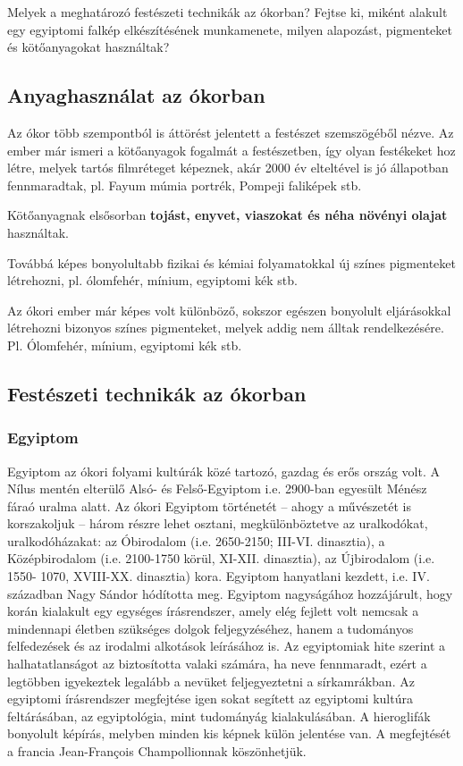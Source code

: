 	Melyek a meghatározó festészeti technikák az ókorban? Fejtse ki, miként alakult egy egyiptomi falkép elkészítésének munkamenete, milyen alapozást, pigmenteket és kötőanyagokat használtak?
	
	\subsection{Anyaghasználat az ókorban}
	
	Az ókor több szempontból is áttörést jelentett a festészet szemszögéből nézve. Az ember már ismeri a kötőanyagok fogalmát a festészetben, így olyan festékeket hoz létre, melyek tartós filmréteget képeznek, akár 2000 év elteltével is jó állapotban fennmaradtak, pl. Fayum múmia portrék, Pompeji faliképek stb. 
	
	Kötőanyagnak elsősorban\textbf{ tojást, enyvet, viaszokat és néha növényi olajat} használtak.
	
	Továbbá képes bonyolultabb fizikai és kémiai folyamatokkal új színes pigmenteket létrehozni, pl. ólomfehér, mínium, egyiptomi kék stb.
	
	Az ókori ember már képes volt különböző, sokszor egészen bonyolult eljárásokkal létrehozni bizonyos színes pigmenteket, melyek addig nem álltak rendelkezésére. Pl. Ólomfehér, mínium, egyiptomi kék stb.
	
	\subsection{Festészeti technikák az ókorban}
	\subsubsection{Egyiptom}
	
	Egyiptom az ókori folyami kultúrák közé tartozó, gazdag és erős ország volt. A Nílus mentén
	elterülő Alsó- és Felső-Egyiptom i.e. 2900-ban egyesült Ménész fáraó uralma alatt. Az ókori
	Egyiptom történetét – ahogy a művészetét is korszakoljuk – három részre lehet osztani,
	megkülönböztetve az uralkodókat, uralkodóházakat: az Óbirodalom (i.e. 2650-2150; III-VI.
	dinasztia), a Középbirodalom (i.e. 2100-1750 körül, XI-XII. dinasztia), az Újbirodalom (i.e. 1550-
	1070, XVIII-XX. dinasztia) kora. Egyiptom hanyatlani kezdett, i.e. IV. században Nagy
	Sándor hódította meg.
	Egyiptom nagyságához hozzájárult, hogy korán kialakult egy egységes írásrendszer, amely
	elég fejlett volt nemcsak a mindennapi életben szükséges dolgok feljegyzéséhez, hanem a
	tudományos felfedezések és az irodalmi alkotások leírásához is. Az egyiptomiak hite szerint a
	halhatatlanságot az biztosította valaki számára, ha neve fennmaradt, ezért a legtöbben
	igyekeztek legalább a nevüket feljegyeztetni a sírkamrákban.
	Az egyiptomi írásrendszer megfejtése igen sokat segített az egyiptomi kultúra feltárásában, az
	egyiptológia, mint tudományág kialakulásában. A hieroglifák bonyolult képírás, melyben
	minden kis képnek külön jelentése van. A megfejtését a francia Jean-François Champollionnak köszönhetjük. 
	
